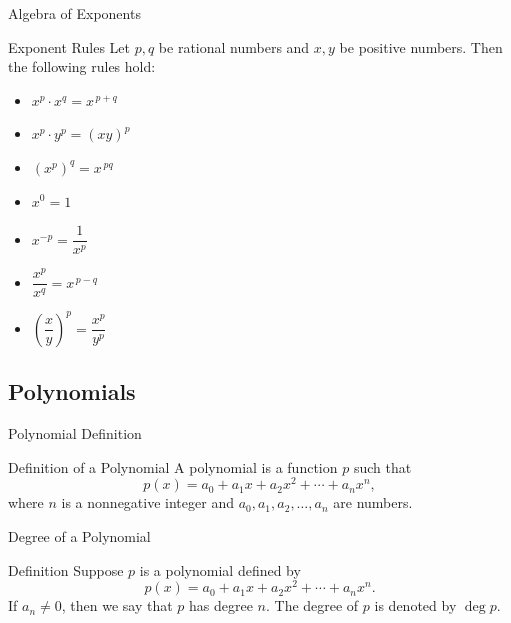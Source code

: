 \documentclass{beamer}
\begin{document}
\begin{frame}{Algebra of Exponents}
  \begin{block}{Exponent Rules}
    Let \(p, q\) be rational numbers and \(x, y\) be positive numbers. Then the following rules hold:
    \begin{itemize}
      \item \(x^p \cdot x^q = x^{\,p+q}\)
      \item \(x^p \cdot y^p = (xy)^p\)
      \item \((x^p)^q = x^{\,pq}\)
      \item \(x^0 = 1\)
      \item \(x^{-p} = \dfrac{1}{x^p}\)
      \item \(\dfrac{x^p}{x^q} = x^{\,p-q}\)
      \item \(\left(\dfrac{x}{y}\right)^p = \dfrac{x^p}{y^p}\)
    \end{itemize}
  \end{block}
\end{frame}
\subsection{Polynomials}
\begin{frame}{Polynomial Definition}
  \begin{block}{Definition of a Polynomial}
    A polynomial is a function \( p \) such that
    \[
      p(x) = a_0 + a_1 x + a_2 x^2 + \cdots + a_n x^n,
    \]
    where \( n \) is a nonnegative integer and \( a_0, a_1, a_2, \dots, a_n \) are numbers.
  \end{block}
\end{frame}

\begin{frame}{Degree of a Polynomial}
  \begin{block}{Definition}
    Suppose \( p \) is a polynomial defined by
    \[
      p(x) = a_0 + a_1 x + a_2 x^2 + \cdots + a_n x^n.
    \]
    If \( a_n \neq 0 \), then we say that \( p \) has degree \( n \). The degree of \( p \) is denoted by \(\deg p\).
  \end{block}
\end{frame}
\end{document}
